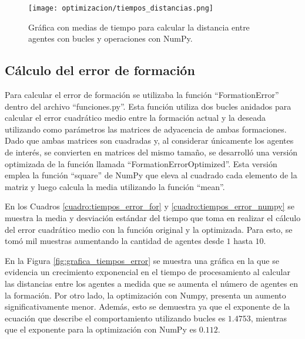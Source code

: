 \begin{figure}[H]
	\centering
	\texttt{[image: optimizacion/tiempos\_distancias.png]}
	\caption{Gráfica con medias de tiempo para calcular la distancia entre agentes con bucles y operaciones con NumPy.}
	\label{fig:grafica_tiempos_distancias}
\end{figure}

\subsection{Cálculo del error de formación}
Para calcular el error de formación se utilizaba la función ``FormationError'' dentro del archivo ``funciones.py''. Esta función utiliza dos bucles anidados para calcular el error cuadrático medio entre la formación actual y la deseada utilizando como parámetros las matrices de adyacencia de ambas formaciones. Dado que ambas matrices son cuadradas y, al considerar únicamente los agentes de interés, se convierten en matrices del mismo tamaño, se desarrolló una versión optimizada de la función llamada ``FormationErrorOptimized''. Esta versión emplea la función ``square'' de NumPy que eleva al cuadrado cada elemento de la matriz y luego calcula la media utilizando la función ``mean''.

En los Cuadros \ref{cuadro:tiempos_error_for} y \ref{cuadro:tiempos_error_numpy} se muestra la media y desviación estándar del tiempo que toma en realizar el cálculo del error cuadrático medio con la función original y la optimizada. Para esto, se tomó mil muestras aumentando la cantidad de agentes desde $1$ hasta $10$. 

En la Figura \ref{fig:grafica_tiempos_error} se muestra una gráfica en la que se evidencia un crecimiento exponencial en el tiempo de procesamiento al calcular las distancias entre los agentes a medida que se aumenta el número de agentes en la formación. Por otro lado, la optimización con Numpy, presenta un aumento significativamente menor. Además, esto se demuestra ya que el exponente de la ecuación que describe el comportamiento utilizando bucles es $1.4753$, mientras que el exponente para la optimización con NumPy es $0.112$.

